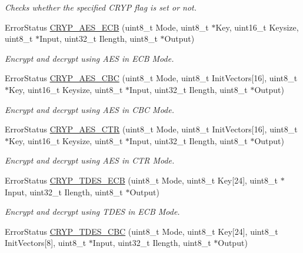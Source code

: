 \begin{DoxyCompactItemize}
\begin{DoxyCompactList}\small\item\em Checks whether the specified C\-R\-Y\-P flag is set or not. \end{DoxyCompactList}\item 
Error\-Status \hyperlink{group___c_r_y_p_ga79ff82ece0e9620dc86d6e57abe639e1}{C\-R\-Y\-P\-\_\-\-A\-E\-S\-\_\-\-E\-C\-B} (uint8\-\_\-t Mode, uint8\-\_\-t $\ast$Key, uint16\-\_\-t Keysize, uint8\-\_\-t $\ast$Input, uint32\-\_\-t Ilength, uint8\-\_\-t $\ast$Output)
\begin{DoxyCompactList}\small\item\em Encrypt and decrypt using A\-E\-S in E\-C\-B Mode. \end{DoxyCompactList}\item 
Error\-Status \hyperlink{group___c_r_y_p_gaa43eadf707257710f6a53b3295b39d70}{C\-R\-Y\-P\-\_\-\-A\-E\-S\-\_\-\-C\-B\-C} (uint8\-\_\-t Mode, uint8\-\_\-t Init\-Vectors\mbox{[}16\mbox{]}, uint8\-\_\-t $\ast$Key, uint16\-\_\-t Keysize, uint8\-\_\-t $\ast$Input, uint32\-\_\-t Ilength, uint8\-\_\-t $\ast$Output)
\begin{DoxyCompactList}\small\item\em Encrypt and decrypt using A\-E\-S in C\-B\-C Mode. \end{DoxyCompactList}\item 
Error\-Status \hyperlink{group___c_r_y_p_ga2f36aea6e94452e5e5e938547fb89d4c}{C\-R\-Y\-P\-\_\-\-A\-E\-S\-\_\-\-C\-T\-R} (uint8\-\_\-t Mode, uint8\-\_\-t Init\-Vectors\mbox{[}16\mbox{]}, uint8\-\_\-t $\ast$Key, uint16\-\_\-t Keysize, uint8\-\_\-t $\ast$Input, uint32\-\_\-t Ilength, uint8\-\_\-t $\ast$Output)
\begin{DoxyCompactList}\small\item\em Encrypt and decrypt using A\-E\-S in C\-T\-R Mode. \end{DoxyCompactList}\item 
Error\-Status \hyperlink{group___c_r_y_p_ga17c03ab4f0566fcbc3dd8c052e6f9886}{C\-R\-Y\-P\-\_\-\-T\-D\-E\-S\-\_\-\-E\-C\-B} (uint8\-\_\-t Mode, uint8\-\_\-t Key\mbox{[}24\mbox{]}, uint8\-\_\-t $\ast$Input, uint32\-\_\-t Ilength, uint8\-\_\-t $\ast$Output)
\begin{DoxyCompactList}\small\item\em Encrypt and decrypt using T\-D\-E\-S in E\-C\-B Mode. \end{DoxyCompactList}\item 
Error\-Status \hyperlink{group___c_r_y_p_gabe52a368c4882450c1e82f16bc1eb686}{C\-R\-Y\-P\-\_\-\-T\-D\-E\-S\-\_\-\-C\-B\-C} (uint8\-\_\-t Mode, uint8\-\_\-t Key\mbox{[}24\mbox{]}, uint8\-\_\-t Init\-Vectors\mbox{[}8\mbox{]}, uint8\-\_\-t $\ast$Input, uint32\-\_\-t Ilength, uint8\-\_\-t $\ast$Output)

\end{DoxyCompactItemize}
